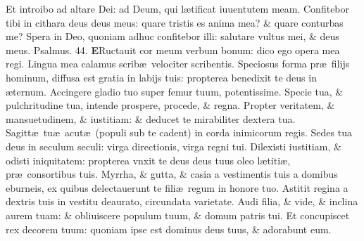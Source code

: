 \documentclass[a5paper,10pt]{book}
\def\ae{æ}
\begin{document}
\begin{multicols*}{2}
\newline \color{red} E\color{black}t introibo ad altare Dei: ad Deum, qui l\ae tificat iuuentutem meam.
\newline \color{red} C\color{black}onfitebor tibi in cithara deus deus meus: quare tristis es anima mea? \& quare conturbas me?
\newline \color{red} S\color{black}pera in Deo, quoniam adhuc confitebor illi: salutare vultus mei, \& deus meus.\quad \color{red} Psalmus. \hypertarget{ps44}{44.} \color{black}
\vspace{-1em}
\lettrine[lines=2]{\bfseries \color{red} E}{}Ructauit cor meum verbum bonum: dico ego opera mea regi.
\newline \color{red} L\color{black}ingua mea calamus scrib\ae \ velociter scribentis.
\newline \color{red} S\color{black}peciosus forma pr\ae \ filijs hominum, diffusa est gratia in labijs tuis: propterea benedixit te deus in \ae ternum.
\newline \color{red} A\color{black}ccingere gladio tuo super femur tuum, potentissime.
\newline \color{red} S\color{black}pecie tua, \& pulchritudine tua, intende prospere, procede, \& regna.
\newline \color{red} P\color{black}ropter veritatem, \& mansuetudinem, \& iustitiam: \& deducet te mirabiliter dextera tua.
\newline \color{red} S\color{black}agitt\ae \ tu\ae \ acut\ae \ (populi sub te cadent) in corda inimicorum regis.
\newline \color{red} S\color{black}edes tua deus in seculum seculi: virga directionis, virga regni tui.
\newline \color{red} D\color{black}ilexisti iustitiam, \& odisti iniquitatem: propterea vnxit te deus deus tuus oleo l\ae titi\ae , pr\ae \ consortibus tuis.
\newline \color{red} M\color{black}yrrha, \& gutta, \& casia a vestimentis tuis a domibus eburneis, ex quibus delectauerunt te fili\ae \ regum in honore tuo.
\newline \color{red} A\color{black}stitit regina a dextris tuis in vestitu deaurato, circundata varietate.
\newline \color{red} A\color{black}udi filia, \& vide, \& inclina aurem tuam: \& obliuiscere populum tuum, \& domum patris tui.
\newline \color{red} E\color{black}t concupiscet rex decorem tuum: quoniam ipse est dominus deus tuus, \& adorabunt eum.

\end{multicols*}
\end{document}
